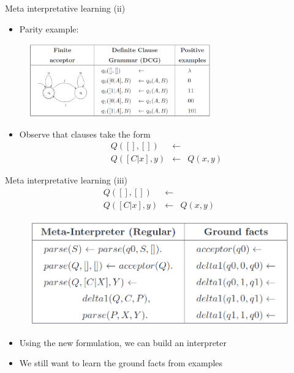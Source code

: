 \begin{frame}{Meta interpretative learning (ii)}
\begin{itemize}
    \item Parity example:
\end{itemize}
\begin{figure}
    \centering
    \includegraphics[width = 0.7\textwidth]{images/parity schema.png}
\end{figure}
\begin{itemize}
\item Observe that clauses take the form
\begin{eqnarray*}
Q([],[]) &\leftarrow& \\
Q([C|x],y) &\leftarrow& Q(x,y)
\end{eqnarray*}
\end{itemize}
\end{frame}

\begin{frame}{Meta interpretative learning (iii)}
\vfill
\begin{eqnarray*}
Q([],[]) &\leftarrow& \\
Q([C|x],y) &\leftarrow& Q(x,y)
\end{eqnarray*}
\vfill
\begin{figure}
    \centering
    \includegraphics[width=.7\textwidth]{images/metainterpret.png}
\end{figure}    
\vfill
\begin{itemize}
    \item Using the new formulation, we can build an interpreter
    \item We still want to learn the ground facts from examples
\end{itemize}
\end{frame}

